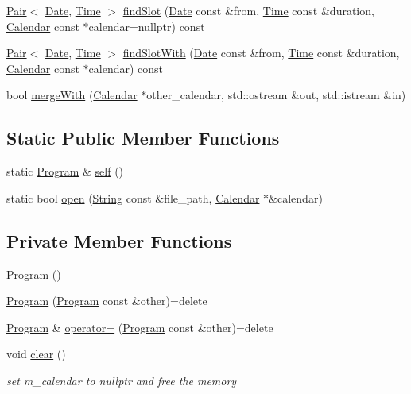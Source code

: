 \begin{DoxyCompactItemize}
\item 
\hyperlink{structPair}{Pair}$<$ \hyperlink{classDate}{Date}, \hyperlink{classTime}{Time} $>$ \hyperlink{classProgram_a639a0af6603bda2f6dc8ec051fd1dd93}{find\+Slot} (\hyperlink{classDate}{Date} const \&from, \hyperlink{classTime}{Time} const \&duration, \hyperlink{classCalendar}{Calendar} const $\ast$calendar=nullptr) const
\item 
\hyperlink{structPair}{Pair}$<$ \hyperlink{classDate}{Date}, \hyperlink{classTime}{Time} $>$ \hyperlink{classProgram_aa2159591c5711c2846c261cd672643d6}{find\+Slot\+With} (\hyperlink{classDate}{Date} const \&from, \hyperlink{classTime}{Time} const \&duration, \hyperlink{classCalendar}{Calendar} const $\ast$calendar) const
\item 
bool \hyperlink{classProgram_aea58a5865e12fbbb2dda1563e66d092a}{merge\+With} (\hyperlink{classCalendar}{Calendar} $\ast$other\+\_\+calendar, std\+::ostream \&out, std\+::istream \&in)
\end{DoxyCompactItemize}
\subsection*{Static Public Member Functions}
\begin{DoxyCompactItemize}
\item 
static \hyperlink{classProgram}{Program} \& \hyperlink{classProgram_a6f703bef529f93987481e04ab6f3014a}{self} ()
\item 
static bool \hyperlink{classProgram_ad12fa0703d93dbec2b2badc96ab97cf6}{open} (\hyperlink{classString}{String} const \&file\+\_\+path, \hyperlink{classCalendar}{Calendar} $\ast$\&calendar)
\end{DoxyCompactItemize}
\subsection*{Private Member Functions}
\begin{DoxyCompactItemize}
\item 
\hyperlink{classProgram_aaefaa0df08f3484476fc4d61e97acbdc}{Program} ()
\item 
\hyperlink{classProgram_a9261168f1c251276a449ec0216c07650}{Program} (\hyperlink{classProgram}{Program} const \&other)=delete
\item 
\hyperlink{classProgram}{Program} \& \hyperlink{classProgram_af46704d2258695db8d0bc7d2b5edf48e}{operator=} (\hyperlink{classProgram}{Program} const \&other)=delete
\item 
void \hyperlink{classProgram_a6fd6135c7adf5af67b55a2303d95defe}{clear} ()
\begin{DoxyCompactList}\small\item\em set m\+\_\+calendar to nullptr and free the memory \end{DoxyCompactList}\end{DoxyCompactItemize}
